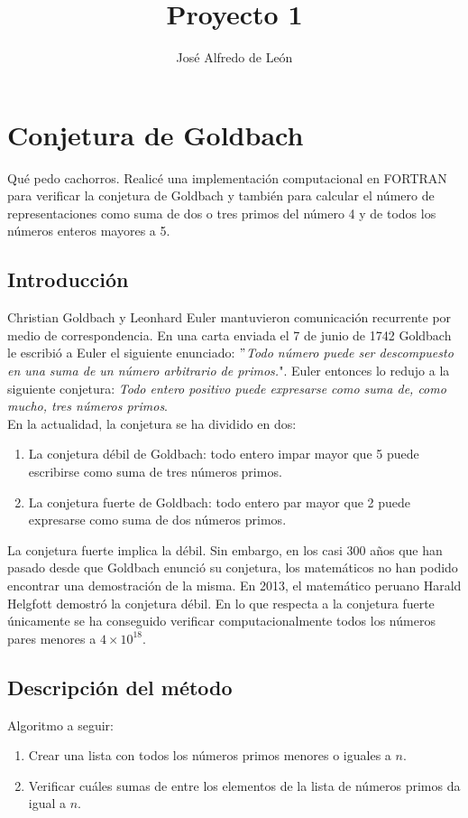 \documentclass[11pt,letterpaper]{book}
\author{José Alfredo de León}
\title{Proyecto 1}
\begin{document}
\maketitle

\chapter{Conjetura de Goldbach}

\abstractname{Qué pedo cachorros.}
Realicé una implementación computacional en FORTRAN para verificar la conjetura de Goldbach y también para calcular el número de representaciones como suma de dos o tres primos del número 4 y de todos los números enteros mayores a 5. 

\section{Introducción}
Christian Goldbach y Leonhard Euler mantuvieron comunicación recurrente por medio de correspondencia. En una carta enviada el 7 de junio de 1742 Goldbach le escribió a Euler el siguiente enunciado: $"$\textit{Todo número puede ser descompuesto en una suma de un número arbitrario de primos.}". Euler entonces lo redujo a la siguiente conjetura: \textit{Todo entero positivo puede expresarse como suma de, como mucho, tres números primos}. \\

En la actualidad, la conjetura se ha dividido en dos:
\begin{enumerate}
	\item La conjetura débil de Goldbach: todo entero impar mayor que 5 puede escribirse como suma de tres números primos.
	\item La conjetura fuerte de Goldbach: todo entero par mayor que 2 puede expresarse como suma de dos números primos. 
\end{enumerate}
La conjetura fuerte implica la débil. Sin embargo, en los casi 300 años que han pasado desde que Goldbach enunció su conjetura, los matemáticos no han podido encontrar una demostración de la misma. En 2013, el matemático peruano Harald Helgfott demostró la conjetura débil. En lo que respecta a la conjetura fuerte únicamente se ha conseguido verificar computacionalmente todos los números pares menores a $4\times 10^{18}$.

\section{Descripción del método}
Algoritmo a seguir:
\begin{enumerate}
	\item Crear una lista con todos los números primos menores o iguales a $n$.
	\item Verificar cuáles sumas de entre los elementos de la lista de números primos da igual a $n$.
\end{enumerate}
\end{document}
